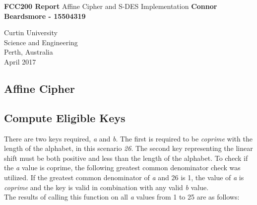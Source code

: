 \documentclass[]{article}
\begin{document}

\begin{titlepage}
	\begin{center}
		\vspace*{1cm}
		\LARGE\textbf{FCC200 Report}
		\break
		Affine Cipher and S-DES Implementation
		\vspace{1cm}
		\break
		\Large\textbf{Connor Beardsmore - 15504319} 
		\vspace{15cm}

		\normalsize
		Curtin University \\
		Science and Engineering \\
		Perth, Australia \\
	    April 2017
	    
	\end{center}
\end{titlepage}


\vspace*{-0.8cm}
\begin{center}
	\section*{Affine Cipher}
\end{center}

\vspace*{0.8cm}
\subsection*{Compute Eligible Keys}

There are two keys required, \textit{a} and \textit{b}. The first is required to be \textit{coprime} with the length of the alphabet, in this scenario \textit{26}. The second key representing the linear shift must be both positive and less than the length of the alphabet. To check if the \textit{a} value is coprime, the following greatest common denominator check was utilized. If the greatest common denominator of \textit{a} and 26 is 1, the value of \textit{a} is \textit{coprime} and the key is valid in combination with any valid \textit{b} value.\\

 

\vspace{0.5cm}
\noindent
The results of calling this function on all \textit{a} values from 1 to 25 are as follows:\\
\end{document}

